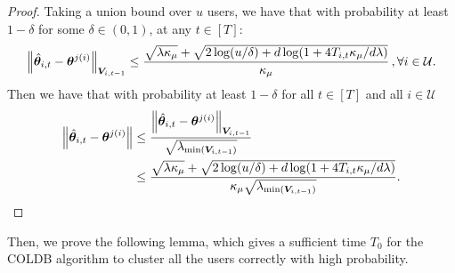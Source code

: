 \begin{proof}
Taking a union bound over $u$ users, we have that with probability at least $1-\delta$ for some $\delta\in(0,1)$, at any $t\in[T]$:
\begin{equation}
    \left\| \hat{\boldsymbol{\theta}}_{i,t}-\boldsymbol{\theta}^{j(i)} \right\|_{\boldsymbol{V}_{i,t-1}}\leq\frac{\sqrt{\lambda \kappa_\mu}+\sqrt{2\log(u/\delta)+d\log(1+4T_{i,t}\kappa_\mu/d\lambda)}}{\kappa_\mu}\label{V norm difference bound union}\,, \forall i\in \mathcal{U}.
\end{equation}
Then we have that with probability at least $1-\delta$ for all $t\in[T]$ and all $i\in\mathcal{U}$
\begin{align}
    \left\| \hat{\boldsymbol{\theta}}_{i,t}-\boldsymbol{\theta}^{j(i)} \right\|&\leq \frac{\left\| \hat{\boldsymbol{\theta}}_{i,t}-\boldsymbol{\theta}^{j(i)} \right\|_{\boldsymbol{V}_{i,t-1}}}{\sqrt{\lambda_{\text{min}(\boldsymbol{V}_{i,t-1})}}}\notag\\
    &\leq \frac{\sqrt{\lambda \kappa_\mu}+\sqrt{2\log(u/\delta)+d\log(1+4T_{i,t}\kappa_\mu/d\lambda)}}{\kappa_\mu{\sqrt{\lambda_{\text{min}(\boldsymbol{V}_{i,t-1})}}}}.
\end{align}
\end{proof}

Then, we prove the following lemma, which gives a sufficient time $T_0$ for the COLDB algorithm to cluster all the users correctly with high probability.

